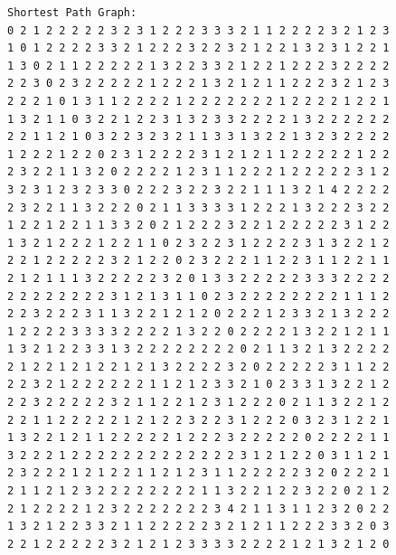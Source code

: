 \documentclass[11pt]{article}
\begin{document}
\begin{lstlisting}
Shortest Path Graph:
0 2 1 2 2 2 2 2 3 2 3 1 2 2 2 3 3 3 2 1 1 2 2 2 2 3 2 1 2 3
1 0 1 2 2 2 2 3 3 2 1 2 2 2 3 2 2 3 2 1 2 2 1 3 2 3 1 2 2 1
1 3 0 2 1 1 2 2 2 2 2 1 3 2 2 3 3 2 1 2 2 1 2 2 2 3 2 2 2 2
2 2 3 0 2 3 2 2 2 2 2 1 2 2 2 1 3 2 1 2 1 1 2 2 2 3 2 1 2 3
2 2 2 1 0 1 3 1 1 2 2 2 2 1 2 2 2 2 2 2 2 1 2 2 2 2 1 2 2 1
1 3 2 1 1 0 3 2 2 1 2 2 3 1 3 2 3 3 2 2 2 2 1 3 2 2 2 2 2 2
2 2 1 1 2 1 0 3 2 2 3 2 3 2 1 1 3 3 1 3 2 2 1 3 2 3 2 2 2 2
1 2 2 2 1 2 2 0 2 3 1 2 2 2 2 3 1 2 1 2 1 1 2 2 2 2 2 1 2 2
2 3 2 2 1 1 3 2 0 2 2 2 2 1 2 3 1 1 2 2 2 1 2 2 2 2 2 3 1 2
3 2 3 1 2 3 2 3 3 0 2 2 2 3 2 2 3 2 2 1 1 1 3 2 1 4 2 2 2 2
2 3 2 2 1 1 3 2 2 2 0 2 1 1 3 3 3 3 1 2 2 2 1 3 2 2 2 3 2 2
1 2 2 1 2 2 1 1 3 3 2 0 2 1 2 2 2 3 2 2 1 2 2 2 2 2 3 1 2 2
1 3 2 1 2 2 2 1 2 2 1 1 0 2 3 2 2 3 1 2 2 2 2 3 1 3 2 2 1 2
2 2 1 2 2 2 2 2 3 2 1 2 2 0 2 3 2 2 2 1 1 2 2 3 1 1 2 2 1 1
2 1 2 1 1 1 3 2 2 2 2 2 3 2 0 1 3 3 2 2 2 2 2 3 3 3 2 2 2 2
2 2 2 2 2 2 2 2 3 1 2 1 3 1 1 0 2 3 2 2 2 2 2 2 2 2 1 1 1 2
2 2 3 2 2 2 3 1 1 3 2 2 1 2 1 2 0 2 2 2 1 2 3 3 2 1 3 2 2 2
1 2 2 2 2 3 3 3 3 2 2 2 2 1 3 2 2 0 2 2 2 2 1 3 2 2 1 2 1 1
1 3 2 1 2 2 3 3 1 3 2 2 2 2 2 2 2 2 0 2 1 1 3 2 1 3 2 2 2 2
2 1 2 2 1 2 1 2 2 1 2 1 3 2 2 2 2 3 2 0 2 2 2 2 2 3 1 1 2 2
2 2 3 2 1 2 2 2 2 2 2 1 1 2 1 2 3 3 2 1 0 2 3 3 1 3 2 2 1 2
2 2 3 2 2 2 2 2 3 2 1 1 2 2 1 2 3 1 2 2 2 0 2 1 1 3 2 2 1 2
2 2 1 1 2 2 2 2 2 1 2 1 2 2 3 2 2 3 1 2 2 2 0 3 2 3 1 2 2 1
1 3 2 2 1 2 1 1 2 2 2 2 2 1 2 2 2 3 2 2 2 2 2 0 2 2 2 2 1 1
3 2 2 2 1 2 2 2 2 2 2 2 2 2 2 2 2 2 3 1 2 1 2 2 0 3 1 1 2 1
2 3 2 2 2 1 2 1 2 2 1 1 2 1 2 3 1 1 2 2 2 2 2 3 2 0 2 2 2 1
2 1 1 2 1 2 3 2 2 2 2 2 2 2 2 1 1 3 2 2 1 2 2 3 2 2 0 2 1 2
2 1 2 2 2 2 1 2 3 2 2 2 2 2 2 2 3 4 2 1 1 3 1 1 2 3 2 0 2 2
1 3 2 1 2 2 3 3 2 1 1 2 2 2 2 2 3 2 1 2 1 1 2 2 2 3 3 2 0 3
2 2 1 2 2 2 2 2 3 2 1 2 1 2 3 3 3 3 2 2 2 2 1 2 1 3 2 1 2 0


\end{lstlisting}
\end{document}
